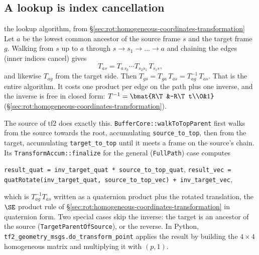 \subsection{A lookup is index cancellation}\label{sec:rot:tf-lookup}

\begin{deriv}{the lookup algorithm, from \S\ref{sec:rot:homogeneous-coordinates-transformation}}
Let $a$ be the lowest common ancestor of the source frame $s$ and the target frame $g$. Walking from $s$ up to $a$ through $s\to s_1\to\dots\to a$ and chaining the edges (inner indices cancel) gives
\[
T_{a s}=T_{a\,s_k}\cdots T_{s_2 s_1}\,T_{s_1 s},
\]
and likewise $T_{a g}$ from the target side. Then $T_{gs}=T_{ga}\,T_{as}=T_{ag}^{-1}\,T_{as}$. That is the entire algorithm. It costs one product per edge on the path plus one inverse, and the inverse is free in closed form: $T^{-1}=\bmat{R\T&-R\T t\\0&1}$ (\S\ref{sec:rot:homogeneous-coordinates-transformation}).
\end{deriv}

The source of tf2 does exactly this. \texttt{BufferCore::walkToTopParent} first walks from the source towards the root, accumulating \texttt{source\_to\_top}, then from the target, accumulating \texttt{target\_to\_top} until it meets a frame on the source's chain. Its \texttt{TransformAccum::finalize} for the general (\texttt{FullPath}) case computes
\begin{center}\small
\texttt{result\_quat = inv\_target\_quat * source\_to\_top\_quat}, \quad
\texttt{result\_vec = quatRotate(inv\_target\_quat, source\_to\_top\_vec) + inv\_target\_vec},
\end{center}
which is $T_{ag}^{-1}T_{as}$ written as a quaternion product plus the rotated translation, the $\SE$ product rule of \S\ref{sec:rot:homogeneous-coordinates-transformation} in quaternion form. Two special cases skip the inverse: the target is an ancestor of the source (\texttt{TargetParentOfSource}), or the reverse. In Python, \texttt{tf2\_geometry\_msgs.do\_transform\_point} applies the result by building the $4\times4$ homogeneous matrix and multiplying it with $(p,1)$.

